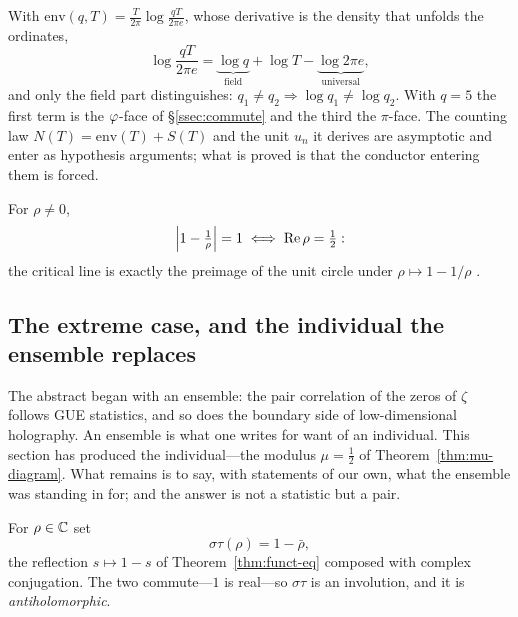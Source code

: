 \begin{proposition}\label{prop:envelope}
With $\mathrm{env}(q,T)=\frac{T}{2\pi}\log\frac{qT}{2\pi e}$, whose derivative is the density that
unfolds the ordinates,
\begin{equation}\label{eq:envelope-splits}
  \log\frac{qT}{2\pi e}=\underbrace{\log q}_{\text{field}}+\log T
  -\underbrace{\log 2\pi e}_{\text{universal}},
\end{equation}
and only the field part distinguishes: $q_1\neq q_2\Rightarrow\log q_1\neq\log q_2$. With $q=5$ the
first term is the $\golden$-face of \S\ref{ssec:commute} and the third the $\pi$-face. The counting
law $N(T)=\mathrm{env}(T)+S(T)$ and the unit $u_n$ it derives are asymptotic and enter as hypothesis
arguments; what is proved is that the conductor entering them is forced.

\end{proposition}

\begin{proposition}\label{prop:li-modulus}
For $\rho\neq0$,
\begin{equation}\label{eq:li-modulus}
  \Bigl\lvert 1-\tfrac1\rho\Bigr\rvert=1 \iff \Re\rho=\tfrac12 :
\end{equation}
the critical line is exactly the preimage of the unit circle under $\rho\mapsto1-1/\rho$ .
\end{proposition}

\subsection{The extreme case, and the individual the ensemble replaces}\label{ssec:extreme}

The abstract began with an ensemble: the pair correlation of the zeros of $\zeta$ follows GUE
statistics, and so does the boundary side of low-dimensional holography. An ensemble is what one
writes for want of an individual. This section has produced the individual---the modulus
$\mu=\tfrac12$ of Theorem~\ref{thm:mu-diagram}. What remains is to say, with statements of our
own, what the ensemble was standing in for; and the answer is not a statistic but a pair.

\begin{definition}\label{def:sdual-mate}
For $\rho\in\C$ set
\begin{equation}\label{eq:sdual-mate}
  \sigma\tau(\rho)=1-\bar\rho ,
\end{equation}
the reflection $s\mapsto1-s$ of Theorem~\ref{thm:funct-eq} composed with complex conjugation.
The two commute---$1$ is real---so $\sigma\tau$ is an involution, and it is
\emph{antiholomorphic}.

\end{definition}

